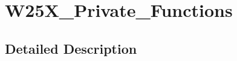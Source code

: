 \hypertarget{group___w25_x___private___functions}{}\section{W25\+X\+\_\+\+Private\+\_\+\+Functions}
\label{group___w25_x___private___functions}


\subsection{Detailed Description}
